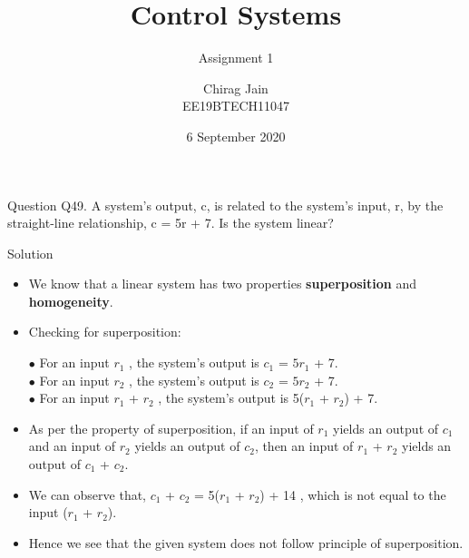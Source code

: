 \documentclass{beamer}
\title{Control Systems}
\subtitle{Assignment 1}
\author{Chirag Jain \\ EE19BTECH11047}
\date{6 September 2020}
\begin{document}
\maketitle

\begin{frame}{Question}
Q49. A system’s output, c, is related to the system’s input,
r, by the straight-line relationship, c = 5r + 7. Is the
system linear?
\end{frame}

\begin{frame}{Solution}

\begin{itemize}
    \item We know that a linear system has two properties \textbf{superposition} and \textbf{homogeneity}.
    \item {Checking for superposition:}
    \begin{itemize}
        \subitem $\bullet$ {For an input \(r_1\) , the system's output is \(c_1\) = \(5r_1\) + 7.}\\
        \subitem $\bullet$ {For an input \(r_2\) , the system's output is \(c_2\) = \(5r_2\) + 7.}\\
        \subitem $\bullet$ {For an input \(r_1\) + \(r_2\) , the system's output is 5(\(r_1\) + \(r_2\)) + 7.}\\
    \end{itemize}
    \item As per the property of superposition, if an input of \(r_1\) yields an output of \(c_1\) and an input of \(r_2\) yields an output of \(c_2\), then an input of \(r_1\) + \(r_2\) yields an output of \(c_1\) + \(c_2\).\\
    \item We can observe that, \(c_1\) + \(c_2\) = 5(\(r_1\) + \(r_2\)) + 14 , which is not equal to the input (\(r_1\) + \(r_2\)).
    \item Hence we see that the given system does not follow principle of superposition.
\end{itemize}
\end{frame}
\end{document}
